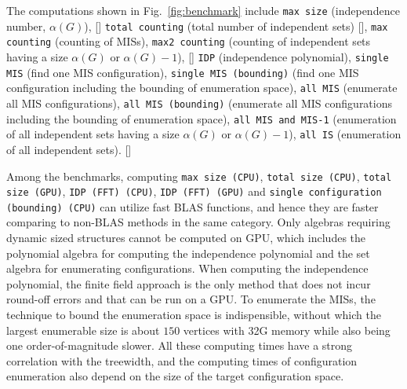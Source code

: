 \documentclass[onefignum, onetabnum]{siamart190516}
\newcommand{\<}{\langle}
\renewcommand{\>}{\rangle}
\newcommand{\Fig}[1]{Fig.~\ref{#1}}
\newcommand{\red}[1]{[{\bf  \color{red}{ST: #1}}]}
\begin{document}
The computations shown in \Fig{fig:benchmark} include \texttt{max size} (independence number, $\alpha(G)$), \red{we can consider changing `max size' to `ind number', but I am okay with both}
 \texttt{total counting} (total number of independent sets) \red{should we change total size to total counting here, since max size meant max size of the set}, 
 \texttt{max counting} (counting of MISs), 
 \texttt{max2 counting} (counting of independent sets having a size $\alpha(G)$ or $\alpha(G)-1$), \red{we can consider changing `max counting' and `max2 counting' to `MIS counting' and `MIS and MIS-1 counting', but I am okay with both notations}
 \texttt{IDP} (independence polynomial), 
 \texttt{single MIS} (find one MIS configuration), 
 \texttt{single MIS (bounding)} (find one MIS configuration including the bounding of enumeration space), \texttt{all MIS} (enumerate all MIS configurations), 
\texttt{all MIS (bounding)} (enumerate all MIS configurations including the bounding of enumeration space),
\texttt{all MIS and MIS-1} (enumeration of all independent sets having a size $\alpha(G)$ or $\alpha(G)-1$),
\texttt{all IS} (enumeration of all independent sets).
\red{Jinguo, should we include maximal independence polynomial and enumeration of all maximal independent sets as well? I think that will make the benchmark more complete.}


Among the benchmarks, computing \texttt{max size (CPU)},
\texttt{total size (CPU)}, \texttt{total size (GPU)}, \texttt{IDP (FFT) (CPU)}, \texttt{IDP (FFT) (GPU)} and \texttt{single configuration (bounding) (CPU)} can utilize fast BLAS functions, and hence 
they are faster comparing to non-BLAS methods in the same category.
Only algebras requiring dynamic sized structures cannot be computed on GPU, which includes the polynomial algebra for computing the independence polynomial and the set algebra for enumerating configurations.
When computing the independence polynomial, the finite field approach is the only method that does not incur round-off errors and that can be run on a GPU.
To enumerate the MISs, the technique to bound the enumeration space is indispensible,
without which the largest enumerable size is about $150$ vertices with 32G memory while also being one order-of-magnitude slower.
All these computing times have a strong correlation with the treewidth, 
and the computing times of configuration enumeration also depend on the size of the target configuration space.
\end{document}
